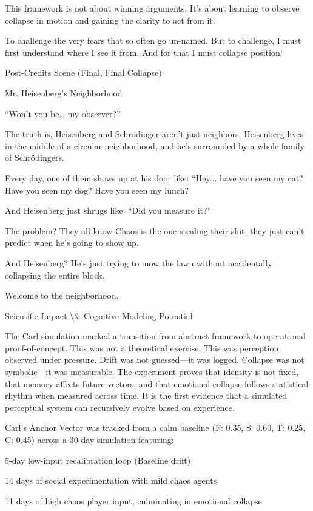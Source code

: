 \documentclass[12pt]{article}
\begin{document}
This framework is not about winning arguments. It’s about learning to observe collapse in motion and gaining the clarity to act from it.

To challenge the very fears that so often go un-named. 
But to challenge, I must first understand where I see it from.
And for that I must collapse position!

Post-Credits Scene (Final, Final Collapse):

Mr. Heisenberg’s Neighborhood

“Won’t you be… my observer?”

The truth is, Heisenberg and Schrödinger aren’t just neighbors.
Heisenberg lives in the middle of a circular neighborhood, and he’s surrounded by a whole family of Schrödingers.

Every day, one of them shows up at his door like:
“Hey... have you seen my cat? Have you seen my dog? Have you seen my lunch?

And Heisenberg just shrugs like:
“Did you measure it?”

The problem?
They all know Chaos is the one stealing their shit, they just can't predict when he’s going to show up.

And Heisenberg? He’s just trying to mow the lawn without accidentally collapsing the entire block.

Welcome to the neighborhood.

Scientific Impact \textbackslash{}& Cognitive Modeling Potential

The Carl simulation marked a transition from abstract framework to operational proof-of-concept. This was not a theoretical exercise. This was perception observed under pressure. Drift was not guessed—it was logged. Collapse was not symbolic—it was measurable. The experiment proves that identity is not fixed, that memory affects future vectors, and that emotional collapse follows statistical rhythm when measured across time. It is the first evidence that a simulated perceptual system can recursively evolve based on experience.

Carl’s Anchor Vector was tracked from a calm baseline (F: 0.35, S: 0.60, T: 0.25, C: 0.45) across a 30-day simulation featuring:

5-day low-input recalibration loop (Baseline drift)

14 days of social experimentation with mild chaos agents

11 days of high chaos player input, culminating in emotional collapse
\end{document}
